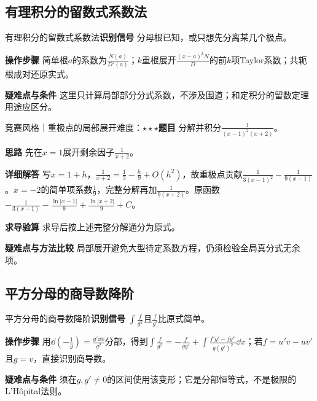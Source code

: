 \subsection{有理积分的留数式系数法}\label{ic:indefinite_algebra_complete:residue}\begin{method}{有理积分的留数式系数法}\textbf{识别信号} 分母根已知，或只想先分离某几个极点。\par \textbf{操作步骤} 简单根$a$的系数为$\frac{N(a)}{D'(a)}$；$k$重根展开$\frac{(x-a)^kN}{D}$的前$k$项Taylor系数；共轭根成对还原实式。\par \textbf{疑难点与条件} 这里只计算局部部分分式系数，不涉及围道；和定积分的留数定理用途应区分。\end{method}

\begin{example}{竞赛风格｜重极点的局部展开}{难度：$\star\star\star$}\label{ic:ex:indefinite_algebra_complete:localcoeff}\textbf{题目} 分解并积分$\frac{1}{(x-1)^2(x+2)}$。\par \textbf{思路} 先在$x=1$展开剩余因子$\frac{1}{x+2}$。\par \textbf{详细解答} 写$x=1+h$，$\frac{1}{x+2}=\frac{1}{3}-\frac{h}{9}+O(h^2)$，故重极点贡献$\frac{1}{3(x-1)^2}-\frac{1}{9(x-1)}$。$x=-2$的简单项系数$\frac{1}{9}$，完整分解再加$\frac{1}{9(x+2)}$。原函数$-\frac{1}{3(x-1)}-\frac{\ln|x-1|}{9}+\frac{\ln|x+2|}{9}+C$。\par \textbf{求导验算} 求导后按上述完整分解通分为原式。\par \textbf{疑难点与方法比较} 局部展开避免大型待定系数方程，仍须检验全局真分式无余项。\end{example}

\subsection{平方分母的商导数降阶}\label{ic:indefinite_algebra_complete:quotient}\begin{method}{平方分母的商导数降阶}\textbf{识别信号} $\int \frac{f}{g^2}$且$\frac{f}{g'}$比原式简单。\par \textbf{操作步骤} 用$\dd(-\frac{1}{g})=\frac{g'\dd x}{g^2}$分部，得到$\int \frac{f}{g^2}=-\frac{f}{gg'}+\int\frac{f'g'-fg''}{g(g')^2}\dd x$；若$f=u'v-uv'$且$g=v$，直接识别商导数。\par \textbf{疑难点与条件} 须在$g,g'\ne0$的区间使用该变形；它是分部恒等式，不是极限的L’Hôpital法则。\end{method}

